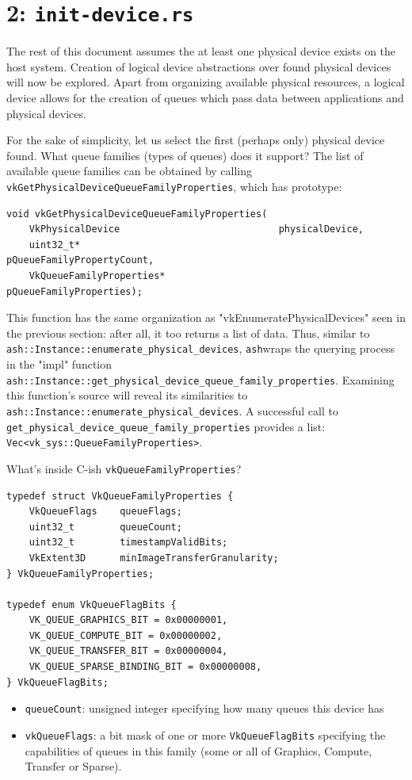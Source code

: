 \documentclass[12pt,letterpaper]{article}
\newcommand{\ril}[1]{\texttt{#1}}
\newcommand{\cil}[1]{\texttt{#1}}
\newcommand{\ash}{\texttt{ash}}
\begin{document}
	
\section{2: \texttt{init-device.rs}}

    The rest of this document assumes the at least one physical device exists on the host system. Creation of logical device abstractions over found physical devices will now be explored. Apart from organizing available physical resources, a logical device allows for the creation of queues which pass data between applications and physical devices. 
		
	For the sake of simplicity, let us select the first (perhaps only) physical device found. What queue families (types of queues) does it support? The list of available queue families can be obtained by calling \cil{vkGetPhysicalDeviceQueueFamilyProperties}, which has prototype:
		\begin{verbatim}
void vkGetPhysicalDeviceQueueFamilyProperties(
	VkPhysicalDevice                            physicalDevice,
	uint32_t*                                   pQueueFamilyPropertyCount,
	VkQueueFamilyProperties*                    pQueueFamilyProperties);
		\end{verbatim}
	This function has the same organization as "vkEnumeratePhysicalDevices" seen in the previous section: after all, it too returns a list of data. Thus, similar to \ril{ash::Instance::enumerate_physical_devices}, \ash wraps the querying process in the "impl" function \ril{ash::Instance::get_physical_device_queue_family_properties}. Examining this function's source will reveal its similarities to \ril{ash::Instance::enumerate_physical_devices}. A successful call to \cil{get_physical_device_queue_family_properties} provides a list:  \ril{Vec<vk_sys::QueueFamilyProperties>}.
		
	What's inside C-ish \cil{vkQueueFamilyProperties}?
	   \begin{verbatim}
typedef struct VkQueueFamilyProperties {
	VkQueueFlags    queueFlags;
	uint32_t        queueCount;
	uint32_t        timestampValidBits;
	VkExtent3D      minImageTransferGranularity;
} VkQueueFamilyProperties;

typedef enum VkQueueFlagBits {
	VK_QUEUE_GRAPHICS_BIT = 0x00000001,
	VK_QUEUE_COMPUTE_BIT = 0x00000002,
	VK_QUEUE_TRANSFER_BIT = 0x00000004,
	VK_QUEUE_SPARSE_BINDING_BIT = 0x00000008,
} VkQueueFlagBits;
	   \end{verbatim}
		\begin{itemize}
			\item \cil{queueCount}: unsigned integer specifying how many queues this device has 
			\item \cil{vkQueueFlags}: a bit mask of one or more \cil{VkQueueFlagBits} specifying the capabilities of queues in this family (some or all of Graphics, Compute, Transfer or Sparse).
		\end{itemize}
		
\end{document}
